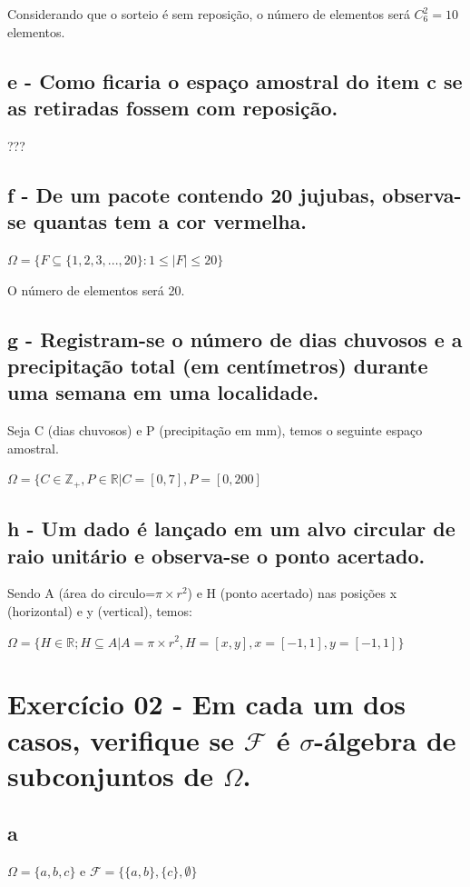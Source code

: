 \documentclass[12pt]{article}
\begin{document}
Considerando que o sorteio é sem reposição, o número de elementos será $C_6^2=10$ elementos.

\subsection*{e - Como ficaria o espaço amostral do item c se as retiradas fossem com reposição.}

???

\subsection*{f - De um pacote contendo 20 jujubas, observa-se quantas tem a cor vermelha.}

$\Omega = \{F \subseteq \{1,2,3,...,20\}: 1 \leq |F| \leq 20\}$

O número de elementos será 20.

\subsection*{g - Registram-se o número de dias chuvosos e a precipitação total (em centímetros) durante uma semana em uma localidade.}

Seja C (dias chuvosos) e P (precipitação em mm), temos o seguinte espaço amostral.

$\Omega = \{C \in \mathbb{Z_+}, P \in \mathbb{R} | C=[0,7], P=[0,200]$

\subsection*{h - Um dado é lançado em um alvo circular de raio unitário e observa-se o ponto acertado.}

Sendo A (área do circulo=$\pi \times r^2$) e H (ponto acertado) nas posições x (horizontal) e y (vertical), temos:

$\Omega = \{H \in \mathbb{R}; H \subseteq A | A=\pi \times r^2, H = [x,y], x = [-1,1], y = [-1,1]\}$

\section*{Exercício 02 - Em cada um dos casos, verifique se $\mathcal{F}$ é $\sigma$-álgebra de subconjuntos de $\Omega$.}

\subsection*{a}
$\Omega = \{ a,b,c\}$ e $\mathcal{F}=\{\{a,b\}, \{c\}, \emptyset \}$
\end{document}

